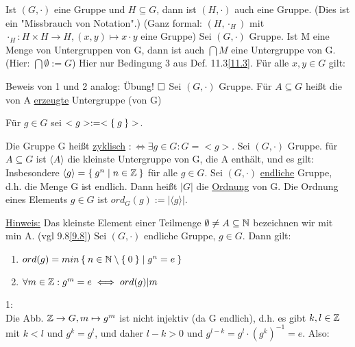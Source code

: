 \documentclass{../../meta/tudscript}
\begin{document}
            Ist $(G, \cdot)$ eine Gruppe und $H \subseteq G$, dann ist $(H, \cdot)$ auch eine Gruppe.
            (Dies ist ein "Missbrauch von Notation".) (Ganz formal: $(H, \cdot_H)$ mit $\cdot_H: H \times H \rightarrow H, (x,y) \mapsto x \cdot y$ eine Gruppe)
            Sei $(G, \cdot)$ Gruppe. Ist M eine Menge von Untergruppen von G, dann ist auch $\bigcap M$ eine Untergruppe von G.
            (Hier: $\bigcap \emptyset := G$)
                Hier nur Bedingung 3 aus Def. 11.3\ref{11.3}.
                Für alle $x,y \in G$ gilt:

                Beweis von 1 und 2 analog: Übung!
                $\hfill\square$
            Sei $(G, \cdot)$ Gruppe. Für $A \subseteq G$ heißt
            die von A \underline{erzeugte} Untergruppe (von G)

            Für $g \in G$ sei $<g> := <\Set{g}>$.

            Die Gruppe G heißt \underline{zyklisch} $:\iff \exists g \in G: G = <g>$.
            Sei $(G, \cdot)$ Gruppe. für $A \subseteq G$ ist $\langle A \rangle$
            die kleinste Untergruppe von G, die A enthält, und es gilt:
            Insbesondere $\langle g \rangle = \Set{g^n \mid n \in \mathbb{Z}}$ für alle $g \in G$.
            Sei $(G, \cdot)$ \underline{endliche} Gruppe, d.h. die Menge G ist endlich.
            Dann heißt $|G|$ die \underline{Ordnung} von G. Die Ordnung eines Elements $g \in G$ ist $ord_G (g) := |\langle g \rangle|$.
            
            \underline{Hinweis:} 
            Das kleinste Element einer Teilmenge $\emptyset \neq A \subseteq \mathbb{N}$ bezeichnen wir mit min A. (vgl 9.8\ref{9.8})
            Sei $(G, \cdot)$ endliche Gruppe, $g \in G$. Dann gilt:
            \begin{enumerate}
                \item $ord (g) = min \Set{n \in \mathbb{N}\setminus \Set{0} | g^n = e}$
                \item $\forall m \in \mathbb{Z}: g^m = e \iff ord(g)|m$
            \end{enumerate}
            1:\\
            Die Abb. $\mathbb{Z} \rightarrow G, m \mapsto g^m$ ist nicht injektiv (da G endlich), 
            d.h. es gibt $k, l \in \mathbb{Z}$ mit $k < l$ und $g^k = g^l$, und daher $l-k > 0$ und
            $g^{l-k} = g^l \cdot (g^k)^{-1} = e$. Also:
            
\end{document}
